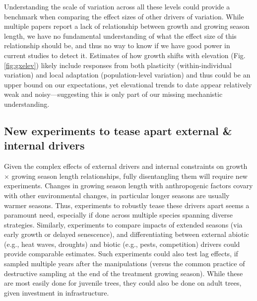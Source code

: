 \documentclass[11pt]{article}
\begin{document}
Understanding the scale of variation across all these levels could provide a benchmark when comparing the effect sizes of other drivers of variation. While multiple papers report a lack of relationship between growth and growing season length, we have no fundamental understanding of what the effect size of this relationship should be, and thus no way to know if we have good power in current studies to detect it. Estimates of how growth shifts with elevation (Fig. \ref{fig:gxelev}) likely include responses from both plasticity (within-individual variation) and local adaptation (population-level variation) and thus could be an upper bound on our expectations, yet elevational trends to date appear relatively weak and noisy---suggesting this is only part of our missing mechanistic understanding. 


\subsection*{New experiments to tease apart external \& internal drivers}

Given the complex effects of external drivers and internal constraints on growth $\times$ growing season length relationships, fully disentangling them will require new experiments. Changes in growing season length with anthropogenic factors covary with other environmental changes, in particular longer seasons are usually warmer seasons. Thus, experiments to robustly tease these drivers apart seems a paramount need, especially if done across multiple species spanning diverse strategies. Similarly, experiments to compare impacts of extended seasons (via early growth or delayed senescence), and differentiating between external abiotic (e.g., heat waves, droughts) and biotic (e.g., pests, competition) drivers could provide comparable estimates. Such experiments could also test lag effects, if sampled multiple years after the manipulations (versus the common practice of destructive sampling at the end of the treatment growing season). While these are most easily done for juvenile trees, they could also be done on adult trees, given investment in infrastructure. %
\end{document}
